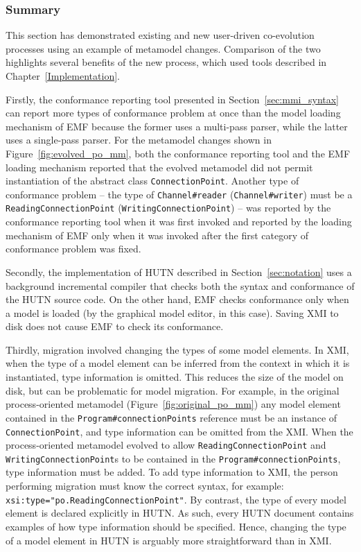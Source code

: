 \subsubsection{Summary}
This section has demonstrated existing and new user-driven co-evolution processes using an example of metamodel changes. Comparison of the two highlights several benefits of the new process, which used tools described in Chapter~\ref{Implementation}.

Firstly, the conformance reporting tool presented in Section~\ref{sec:mmi_syntax} can report more types of conformance problem at once than the model loading mechanism of EMF because the former uses a multi-pass parser, while the latter uses a single-pass parser. For the metamodel changes shown in Figure~\ref{fig:evolved_po_mm}, both the conformance reporting tool and the EMF loading mechanism reported that the evolved metamodel did not permit instantiation of the abstract class \texttt{Co\-nn\-ec\-ti\-o\-nPo\-i\-nt}. Another type of conformance problem -- the type of \texttt{Ch\-an\-n\-el\#re\-ad\-er} (\texttt{Ch\-an\-n\-el\#wr\-it\-er}) must be a \texttt{Re\-ad\-i\-ngCo\-nn\-ec\-ti\-o\-nPo\-i\-nt} (\texttt{Wr\-i\-ti\-ngCo\-nn\-ec\-ti\-o\-nPo\-i\-nt}) -- was reported by the conformance reporting tool when it was first invoked and reported by the loading mechanism of EMF only when it was invoked after the first category of conformance problem was fixed.

Secondly, the implementation of HUTN described in Section~\ref{sec:notation} uses a background incremental compiler that checks both the syntax and conformance of the HUTN source code. On the other hand, EMF checks conformance only when a model is loaded (by the graphical model editor, in this case). Saving XMI to disk does not cause EMF to check its conformance.

Thirdly, migration involved changing the types of some model elements. In XMI, when the type of a model element can be inferred from the context in which it is instantiated, type information is omitted. This reduces the size of the model on disk, but can be problematic for model migration. For example, in the original process-oriented metamodel (Figure~\ref{fig:original_po_mm}) any model element contained in the \texttt{Pr\-og\-r\-am\#co\-nn\-ec\-ti\-onPo\-in\-ts} reference must be an instance of \texttt{Co\-nn\-ec\-ti\-onPo\-in\-t}, and type information can be omitted from the XMI. When the process-oriented metamodel evolved to allow \texttt{Re\-ad\-i\-ngCo\-nn\-ec\-ti\-o\-nPo\-i\-nt} and \texttt{Wr\-i\-ti\-ngCo\-nn\-ec\-ti\-o\-nPo\-i\-nt}s to be contained in the \texttt{Pr\-og\-r\-am\#co\-nn\-ec\-ti\-onPo\-in\-ts}, type information must be added. To add type information to XMI, the person performing migration must know the correct syntax, for example: \texttt{xsi:type="po.Re\-ad\-i\-ngCo\-nn\-ec\-ti\-onPo\-i\-nt"}. By contrast, the type of every model element is declared explicitly in HUTN. As such, every HUTN document contains examples of how type information should be specified. Hence, changing the type of a model element in HUTN is arguably more straightforward than in XMI.

